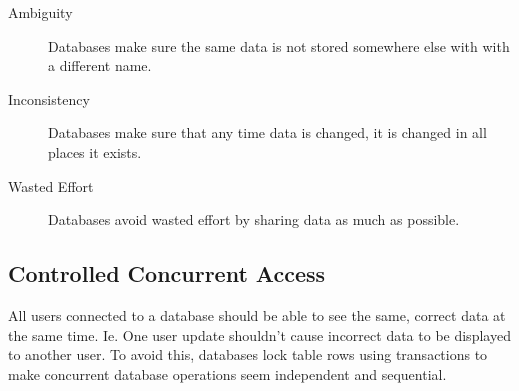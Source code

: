 \begin{description}
    \item[Ambiguity] Databases make sure the same data is not stored somewhere else with with a different name.
        \item[Inconsistency] Databases make sure that any time data is changed, it is changed in all places it exists.
            \item[Wasted Effort] Databases avoid wasted effort by sharing data as much as possible.
\end{description}

\subsection{Controlled Concurrent Access}\label{sub:controlled_concurrent_access}

All users connected to a database should be able to see the same, correct data at the same time. Ie. One user update shouldn't cause incorrect data to be displayed to another user.
To avoid this, databases lock table rows using transactions to make concurrent database operations seem independent and sequential.
